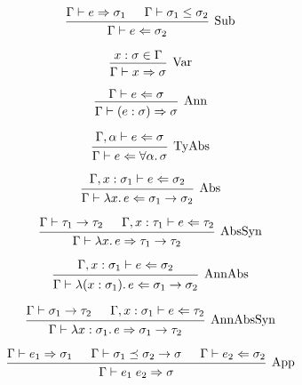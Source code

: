 \documentclass[12pt]{article}
\begin{document}
\pagestyle{empty}

\[
    \begin{prooftree}
        \hypo{\Gamma \vdash e \Rightarrow \sigma_1}
        \hypo{\Gamma \vdash \sigma_1 \leq \sigma_2}
        \infer2[Sub]{\Gamma \vdash e \Leftarrow \sigma_2}
    \end{prooftree}
\]

\[
    \begin{prooftree}
        \hypo{x: \sigma \in \Gamma}
        \infer1[Var]{\Gamma \vdash x \Rightarrow \sigma}
    \end{prooftree}
\]

\[
    \begin{prooftree}
        \hypo{\Gamma \vdash e \Leftarrow \sigma}
        \infer1[Ann]{\Gamma \vdash (e: \sigma) \Rightarrow \sigma}
    \end{prooftree}
\]

\[
    \begin{prooftree}
        \hypo{\Gamma, \alpha \vdash e \Leftarrow \sigma}
        \infer1[TyAbs]{\Gamma \vdash e \Leftarrow \forall \alpha\ldotp \sigma}
    \end{prooftree}
\]

\[
    \begin{prooftree}
        \hypo{\Gamma, x: \sigma_1 \vdash e \Leftarrow \sigma_2}
        \infer1[Abs]{\Gamma \vdash \lambda x\ldotp e \Leftarrow \sigma_1 \to \sigma_2}
    \end{prooftree}
\]

\[
    \begin{prooftree}
        \hypo{\Gamma \vdash \tau_1 \to \tau_2}
        \hypo{\Gamma, x: \tau_1 \vdash e \Leftarrow \tau_2}
        \infer2[AbsSyn]{\Gamma \vdash \lambda x\ldotp e \Rightarrow \tau_1 \to \tau_2}
    \end{prooftree}
\]

\[
    \begin{prooftree}
        \hypo{\Gamma, x: \sigma_1 \vdash e \Leftarrow \sigma_2}
        \infer1[AnnAbs]{\Gamma \vdash \lambda (x: \sigma_1)\ldotp e \Leftarrow \sigma_1 \to \sigma_2}
    \end{prooftree}
\]

\[
    \begin{prooftree}
        \hypo{\Gamma \vdash \sigma_1 \to \tau_2}
        \hypo{\Gamma, x: \sigma_1 \vdash e \Leftarrow \tau_2}
        \infer2[AnnAbsSyn]{\Gamma \vdash \lambda x: \sigma_1\ldotp e \Rightarrow \sigma_1 \to \tau_2}
    \end{prooftree}
\]

\[
    \begin{prooftree}
        \hypo{\Gamma \vdash e_1 \Rightarrow \sigma_1}
        \hypo{\Gamma \vdash \sigma_1 \preceq \sigma_2 \to \sigma}
        \hypo{\Gamma \vdash e_2 \Leftarrow \sigma_2}
        \infer3[App]{\Gamma \vdash e_1\; e_2 \Rightarrow \sigma}
    \end{prooftree}
\]
\end{document}
